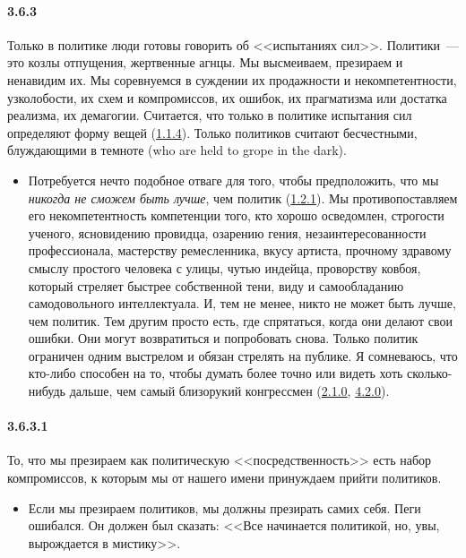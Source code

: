 \paragraph{3.6.3}\hypertarget{par:3.6.3}{} Только в политике люди готовы говорить об <<испытаниях сил>>. Политики~--- это козлы отпущения, жертвенные агнцы. Мы высмеиваем, презираем и ненавидим их. Мы соревнуемся в суждении их продажности и некомпетентности, узколобости, их схем и компромиссов, их ошибок, их прагматизма или достатка реализма, их демагогии. Считается, что только в политике испытания сил определяют форму вещей (\hyperlink{par:1.1.4}{1.1.4}). Только политиков считают бесчестными, блуждающими в темноте (who are held to grope in the dark). 
	\begin{itemize}
	\item 
	Потребуется нечто подобное отваге для того, чтобы предположить, что мы {\itshape никогда не сможем быть лучше}, чем политик (\hyperlink{par:1.2.1}{1.2.1}). Мы противопоставляем его некомпетентность компетенции того, кто хорошо осведомлен, строгости ученого, ясновидению провидца, озарению гения, незаинтересованности профессионала, мастерству ремесленника, вкусу артиста, прочному здравому смыслу простого человека с улицы, чутью индейца, проворству ковбоя, который стреляет быстрее собственной тени, виду и самообладанию самодовольного интеллектуала. И, тем не менее, никто не может быть лучше, чем политик. Тем другим просто есть, где спрятаться, когда они делают свои ошибки. Они могут возвратиться и попробовать снова. Только политик ограничен одним выстрелом и обязан стрелять на публике. Я сомневаюсь, что кто-либо способен на то, чтобы думать более точно или видеть хоть сколько-нибудь дальше, чем самый близорукий конгрессмен (\hyperlink{par:2.1.0}{2.1.0}, \hyperlink{par:4.2.0}{4.2.0}).
	\end{itemize}

\paragraph{3.6.3.1}\hypertarget{par:3.6.3.1}{} То, что мы презираем как политическую <<посредственность>> есть набор компромиссов, к которым мы от нашего имени принуждаем прийти политиков.
	\begin{itemize}
	\item 
	Если мы презираем политиков, мы должны презирать самих себя. Пеги ошибался. Он должен был сказать: <<Все начинается политикой, но, увы, вырождается в мистику>>.
	\end{itemize}


